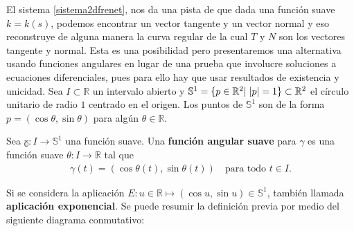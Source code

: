 \documentclass[oneside,11pt]{memoir}
\begin{document}
El sistema \ref{sistema2dfrenet}, nos da una pista de que dada una función suave $k=k(s)$, podemos encontrar un vector tangente y un vector normal y eso reconstruye de alguna manera la curva regular de la cual $T$ y $N$ son los vectores tangente y normal. Esta es una posibilidad pero presentaremos una alternativa usando funciones angulares en lugar de una prueba que involucre soluciones a ecuaciones diferenciales, pues para ello hay que usar resultados de existencia y unicidad. Sea $I\subset \mathbb{R}$ un intervalo abierto y $\mathbb{S}^1=\{p\in \mathbb{R}^2|\hspace{0.1 cm} |p|=1\}\subset \mathbb{R}^2$ el círculo unitario de radio $1$ centrado en el origen. Los puntos de $\mathbb{S}^1$ son de la forma $p=(\cos\theta,\sin\theta)$ para algún $\theta\in \mathbb{R}$.
\begin{definition}
    Sea $\mathbb{\gamma}:I\to\mathbb{S}^1$ una función suave. Una \textbf{función angular suave} para $\gamma$ es una  función suave $\theta:I\to\mathbb{R}$ tal que
    \begin{align*}
        \gamma(t)=(\cos\theta(t), \sin\theta(t)) \quad \text{para todo }t\in I.
    \end{align*}
\end{definition}
Si se considera la aplicación $E:u\in \mathbb{R}\mapsto (\cos u, \sin u)\in \mathbb{S}^1$, también llamada \textbf{aplicación exponencial}. Se puede resumir la definición previa por medio del siguiente diagrama conmutativo:
\end{document}
